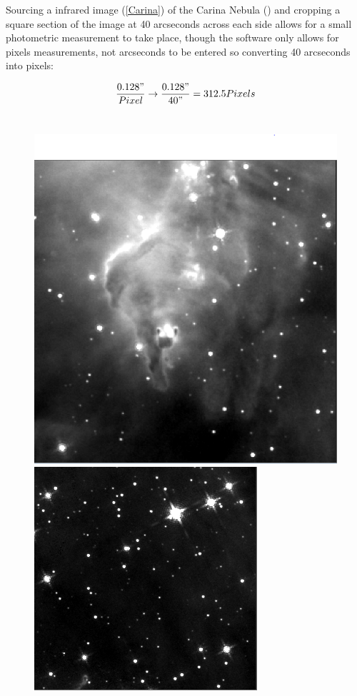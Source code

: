 \documentclass[12pt]{article}
\begin{document}
Sourcing a infrared image (\cref{Carina}) of the Carina Nebula (\cite{CarNeb}) and cropping a square section of the image at 40 arcseconds across each side allows for a small photometric measurement to take place, though the software only allows for pixels measurements, not arcseconds to be entered so converting 40 arcseconds into pixels:

\begin{equation}
\dfrac{0.128"}{Pixel} \rightarrow \dfrac{0.128"}{40"} = 312.5 Pixels
\end{equation} \\

\begin{figure}[H]
\centering
\begin{multicols}{2}
\begin{minipage}[H]{0.5\textwidth}
\includegraphics[scale=0.475]{Images/AsImages/CN/Stars.PNG}
\end{minipage}
\begin{minipage}[H]{0.5\textwidth}
\includegraphics[scale=0.95]{Images/AsImages/CN/darksky.PNG}

\end{minipage}
\end{multicols}
\end{figure}
\end{document}
